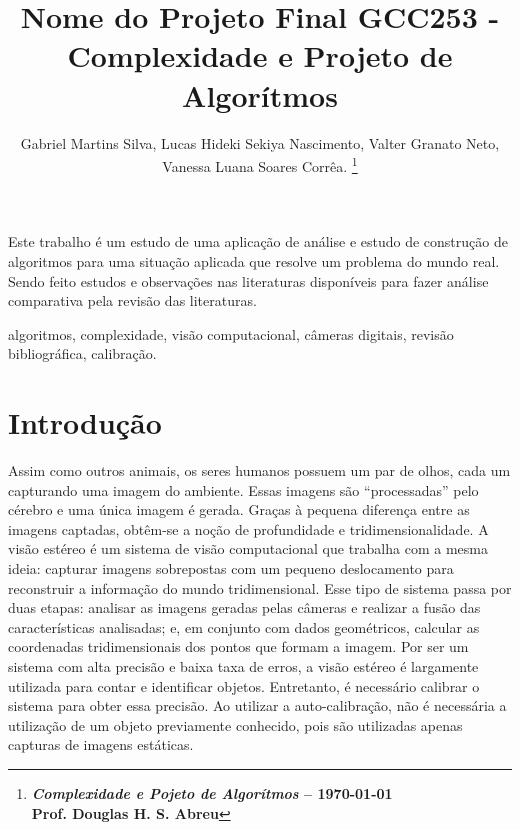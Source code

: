 \documentclass[portuguese]{sbrt}
\begin{document}
 
  
\title{Nome do Projeto Final GCC253 - Complexidade e Projeto de Algorítmos} 
  
\author{Gabriel Martins Silva, Lucas Hideki Sekiya Nascimento, Valter Granato Neto, Vanessa Luana Soares Corrêa. 
\thanks{\centering \textbf{\textit{Complexidade e Pojeto de Algorítmos} -- \today \\ Prof. Douglas H. S. Abreu}}%
} 
  
\maketitle 

  
  
  
  
\begin{resumo} 
Este trabalho é um estudo de uma aplicação de análise e estudo de construção de algoritmos para uma situação aplicada que resolve um problema do mundo real. Sendo feito estudos e observações nas literaturas disponíveis para fazer análise comparativa pela revisão das literaturas.  
\end{resumo} 
\begin{chave} 
algoritmos, complexidade, visão computacional, câmeras digitais, revisão bibliográfica, calibração. 
\end{chave} 
  

  
  

\section{Introdução} 
\label{sec:introducao} 
  
Assim como outros animais, os seres humanos possuem um par de olhos, cada um capturando uma imagem do ambiente. Essas imagens são “processadas” pelo cérebro e uma única imagem é gerada. Graças à pequena diferença entre as imagens captadas, obtêm-se a noção de profundidade e tridimensionalidade. A visão estéreo é um sistema de visão computacional que trabalha com a mesma ideia: capturar imagens sobrepostas com um pequeno deslocamento para reconstruir a informação do mundo tridimensional.
Esse tipo de sistema passa por duas etapas: analisar as imagens geradas pelas câmeras e realizar a fusão das características analisadas; e, em conjunto com dados geométricos, calcular as coordenadas tridimensionais dos pontos que formam a imagem.
Por ser um sistema com alta precisão e baixa taxa de erros, a visão estéreo é largamente utilizada para contar e identificar objetos. Entretanto, é necessário calibrar o sistema para obter essa precisão. Ao utilizar a auto-calibração, não é necessária a utilização de um objeto previamente conhecido, pois são utilizadas apenas capturas de imagens estáticas.
~\cite{cormen:2009}
\end{document}
